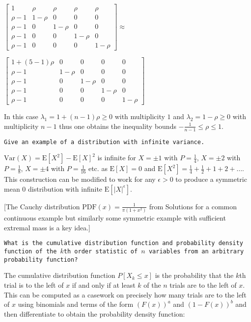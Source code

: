 $
\begin{bmatrix}
1 & \rho & \rho & \rho & \rho \\
\rho-1 & 1-\rho & 0 & 0 & 0 \\
\rho-1 & 0 & 1-\rho & 0 & 0 \\
\rho-1 & 0 & 0 & 1-\rho & 0 \\
\rho-1 & 0 & 0 & 0 & 1-\rho
\end{bmatrix}
\approx
$

$
\begin{bmatrix}
1+(5-1)\rho & 0 & 0 & 0 & 0 \\
\rho-1 & 1-\rho & 0 & 0 & 0 \\
\rho-1 & 0 & 1-\rho & 0 & 0 \\
\rho-1 & 0 & 0 & 1-\rho & 0 \\
\rho-1 & 0 & 0 & 0 & 1-\rho
\end{bmatrix}
$

In this case $\lambda_1 = 1+(n-1)\rho \ge 0$ with multiplicity $1$ and $\lambda_2 = 1-\rho \ge 0$ with multiplicity $n-1$ thus one obtains the inequality bounds $\boxed{-\frac{1}{n-1} \le \rho \le 1}$.

\texttt{Give an example of a distribution with infinite variance.}

$\text{Var}(X)=\text{E}[X^2]-\text{E}[X]^2$ is infinite for $X=\pm 1$ with $P=\frac{1}{4}$, $X=\pm 2$ with $P=\frac{1}{8}$, $X=\pm 4$ with $P=\frac{1}{16}$ etc. as $\text{E}[X]=0$ and $\text{E}[X^2]=\frac{1}{4}+\frac{1}{2}+1+2+\dots$. This construction can be modified to work for any $\epsilon >0$ to produce a symmetric mean $0$ distribution with infinite $\text{E}[|X|^{\epsilon}]$.

[The Cauchy distribution $\text{PDF}(x)=\frac{1}{\pi (1+x^2)}$ from Solutions for a common continuous example but similarly some symmetric example with sufficient extremal mass is a key idea.]

\texttt{What is the cumulative distribution function and probability density function of the $k$th order statistic of $n$ variables from an arbitrary probability function?}

The cumulative distribution function $P[X_k \le x]$ is the probability that the $k$th trial is to the left of $x$ if and only if at least $k$ of the $n$ trials are to the left of $x$. This can be computed as a casework on precisely how many trials are to the left of $x$ using binomials and terms of the form $(F(x))^a$ and $(1-F(x))^b$ and then differentiate to obtain the probability density function:

